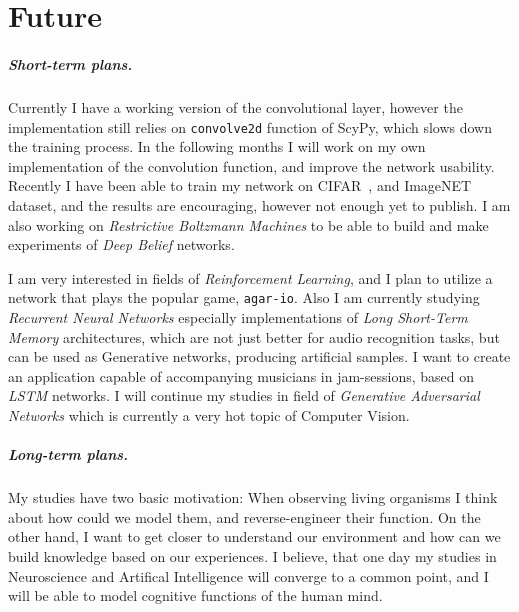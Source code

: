 \chapter{Future}

\paragraph{Short-term plans.} 
Currently I have a working version of the convolutional layer, 
however the implementation still relies on \texttt{convolve2d} function of ScyPy, which slows down the training process.
In the following months I will work on my own implementation of the convolution function, 
and improve the network usability.
Recently I have been able to train my network on CIFAR~\cite{cifar}, and ImageNET~\cite{deng2009imagenet} dataset, and the results are encouraging, however not enough yet to publish.
I am also working on \emph{Restrictive Boltzmann Machines} to be able to build and make experiments of \emph{Deep Belief} networks.

I am very interested in fields of \emph{Reinforcement Learning}, 
and I plan to utilize a network that plays the popular game, \texttt{agar-io}.
Also I am currently studying \emph{Recurrent Neural Networks} especially implementations of \emph{Long Short-Term Memory} architectures, 
which are not just better for audio recognition tasks, but can be used as Generative networks, producing artificial samples.
I want to create an application capable of accompanying musicians in jam-sessions, based on \emph{LSTM} networks.
I will continue my studies in field of \emph{Generative Adversarial Networks} which is currently a very hot topic of Computer Vision.

\paragraph{Long-term plans.}
My studies have two basic motivation:
When observing living organisms I think about how could we model them, 
and reverse-engineer their function. 
On the other hand, I want to get closer to understand our 
environment and how can we build knowledge based on our experiences.
I believe, that one day my studies in Neuroscience and Artifical Intelligence will converge to a common point, and I will be able to model cognitive functions of the human mind.
